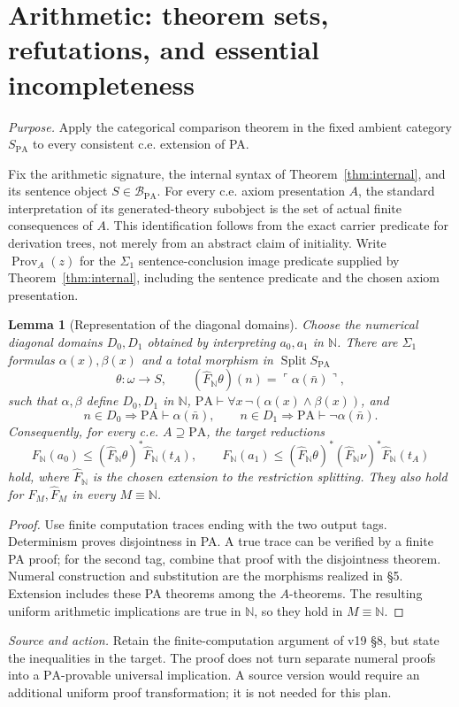 \documentclass[11pt]{article}
\newtheorem{lemma}[theorem]{Lemma}
\theoremstyle{definition}\newtheorem{definition}[theorem]{Definition}
\newcommand{\PA}{\mathrm{PA}}
\newcommand{\N}{\mathbb N}
\newcommand{\Split}{\operatorname{Split}}
\newcommand{\Prov}{\operatorname{Prov}}
\newcommand{\B}{\mathcal B}
\newcommand{\source}[1]{\par\smallskip\noindent\textit{Source and action.} #1\par\smallskip}
\newcommand{\purpose}[1]{\noindent\textit{Purpose.} #1\par\medskip}
\begin{document}
\section{Arithmetic: theorem sets, refutations, and essential incompleteness}
\purpose{Apply the categorical comparison theorem in the fixed ambient category $S_{\PA}$ to every consistent c.e. extension of PA.}
Fix the arithmetic signature, the internal syntax of
Theorem~\ref{thm:internal}, and its sentence object $S\in\B_{\PA}$.
For every c.e. axiom presentation $A$, the standard interpretation
of its generated-theory subobject is the set of actual finite
consequences of $A$.
This identification follows from the exact carrier predicate for
derivation trees, not merely from an abstract claim of initiality.
Write $\Prov_A(z)$ for the $\Sigma_1$ sentence-conclusion image
predicate supplied by Theorem~\ref{thm:internal}, including the
sentence predicate and the chosen axiom presentation.

\begin{lemma}[Representation of the diagonal domains]\label{lem:reduction}
Choose the numerical diagonal domains $D_0,D_1$ obtained by
interpreting $a_0,a_1$ in $\N$. There are $\Sigma_1$ formulas
$\alpha(x),\beta(x)$ and a total morphism in $\Split S_{\PA}$
\[
 \theta:\omega\to S,\qquad
 (\widehat F_{\N}\theta)(n)=\ulcorner\alpha(\bar n)\urcorner,
\]
such that $\alpha,\beta$ define $D_0,D_1$ in $\N$,
$\PA\vdash\forall x\,\neg(\alpha(x)\land\beta(x))$, and
\[
 n\in D_0\Rightarrow\PA\vdash\alpha(\bar n),\qquad
 n\in D_1\Rightarrow\PA\vdash\neg\alpha(\bar n).
\]
Consequently, for every c.e. $A\supseteq\PA$, the target reductions
\[
 F_{\N}(a_0)\le(\widehat F_{\N}\theta)^*\widehat F_{\N}(t_A),\qquad
 F_{\N}(a_1)\le(\widehat F_{\N}\theta)^*
                  (\widehat F_{\N}\nu)^*\widehat F_{\N}(t_A)
\]
hold, where $\widehat F_{\N}$ is the chosen extension to the
restriction splitting. They also hold for $F_M,\widehat F_M$ in
every $M\equiv\N$.
\end{lemma}
\begin{proof}
Use finite computation traces ending with the two output tags.
Determinism proves disjointness in PA. A true trace can be verified
by a finite PA proof; for the second tag, combine that proof with
the disjointness theorem. Numeral construction and substitution are
the morphisms realized in \S5. Extension includes these PA theorems
among the $A$-theorems. The resulting uniform arithmetic implications
are true in $\N$, so they hold in $M\equiv\N$.
\end{proof}
\source{Retain the finite-computation argument of v19 \S8, but state the inequalities in the target. The proof does not turn separate numeral proofs into a $\PA$-provable universal implication. A source version would require an additional uniform proof transformation; it is not needed for this plan.}
\end{document}
